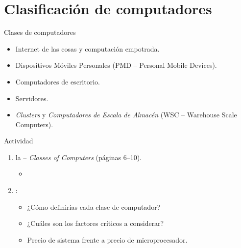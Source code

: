 \section{Clasificación de computadores}

\begin{frame}[t]{Clases de computadores}
\begin{itemize}
  \item Internet de las cosas y computación empotrada.
  \item Dispositivos Móviles Personales (PMD -- Personal Mobile Devices).
  \item Computadores de escritorio.
  \item Servidores.
  \item \emph{Clusters} y \emph{Computadores de Escala de Almacén} (WSC -- Warehouse Scale Computers).
\end{itemize}
\end{frame}

\begin{frame}[t]{Actividad}
\begin{enumerate}
  \item {} la  -- 
        \emph{Classes of Computers} (páginas 6--10).
    \begin{itemize}
      \item \credithennessy
    \end{itemize}

  \item {}:
    \begin{itemize}
      \item ¿Cómo definirías cada clase de computador?
      \item ¿Cuáles son los factores críticos a considerar?
      \item Precio de sistema frente a precio de microprocesador.
    \end{itemize}
\end{enumerate}
\end{frame}

